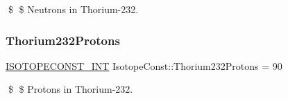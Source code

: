 \$ \$ Neutrons in Thorium-\/232. \mbox{\label{group___isotope_const-_thorium-_th232_ga1c356dcd1ce9a9d3734ce059279428ce}} 
\subsubsection{\texorpdfstring{Thorium232\+Protons}{Thorium232Protons}}
{\footnotesize\ttfamily \mbox{\hyperlink{group___isotope_const-_macros_ga5f18360b3e99483a35c32d789e62621c}{I\+S\+O\+T\+O\+P\+E\+C\+O\+N\+S\+T\+\_\+\+I\+NT}} Isotope\+Const\+::\+Thorium232\+Protons = 90}

\$ \$ Protons in Thorium-\/232. 